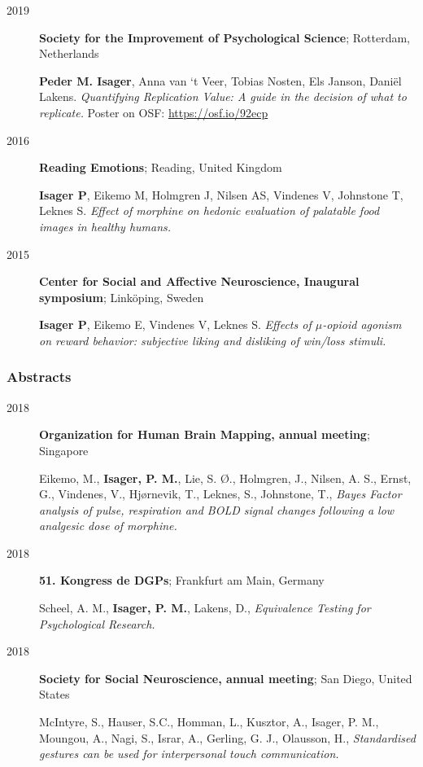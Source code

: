 \documentclass[]{article}
\begin{document}
\begin{description}
\item[2019]
\textbf{Society for the Improvement of Psychological Science};
Rotterdam, Netherlands

\textbf{Peder M. Isager}, Anna van `t Veer, Tobias Nosten, Els Janson,
Daniël Lakens. \emph{Quantifying Replication Value: A guide in the
decision of what to replicate.} Poster on OSF:
\url{https://osf.io/92ecp}
\item[2016]
\textbf{Reading Emotions}; Reading, United Kingdom

\textbf{Isager P}, Eikemo M, Holmgren J, Nilsen AS, Vindenes V,
Johnstone T, Leknes S. \emph{Effect of morphine on hedonic evaluation of
palatable food images in healthy humans.}
\item[2015]
\textbf{Center for Social and Affective Neuroscience, Inaugural
symposium}; Linköping, Sweden

\textbf{Isager P}, Eikemo E, Vindenes V, Leknes S. \emph{Effects of
\(\mu\)-opioid agonism on reward behavior: subjective liking and
disliking of win/loss stimuli.}
\end{description}

\hypertarget{abstracts}{%
\subsubsection{Abstracts}\label{abstracts}}

\begin{description}
\item[2018]
\textbf{Organization for Human Brain Mapping, annual meeting}; Singapore

Eikemo, M., \textbf{Isager, P. M.}, Lie, S. Ø., Holmgren, J., Nilsen, A.
S., Ernst, G., Vindenes, V., Hjørnevik, T., Leknes, S., Johnstone, T.,
\emph{Bayes Factor analysis of pulse, respiration and BOLD signal
changes following a low analgesic dose of morphine.}
\item[2018]
\textbf{51. Kongress de DGPs}; Frankfurt am Main, Germany

Scheel, A. M., \textbf{Isager, P. M.}, Lakens, D., \emph{Equivalence
Testing for Psychological Research.}
\item[2018]
\textbf{Society for Social Neuroscience, annual meeting}; San Diego,
United States

McIntyre, S., Hauser, S.C., Homman, L., Kusztor, A., Isager, P. M.,
Moungou, A., Nagi, S., Israr, A., Gerling, G. J., Olausson, H.,
\emph{Standardised gestures can be used for interpersonal touch
communication.}
\end{description}
\end{document}
